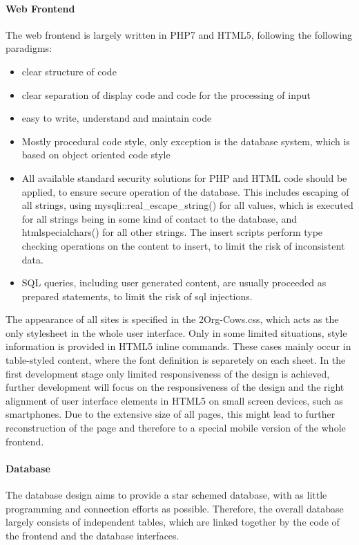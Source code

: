 \paragraph{Web Frontend}
The web frontend is largely written in PHP7 and HTML5, following the following paradigms: 
\begin{itemize}
 \item clear structure of code
 \item clear separation of display code and code for the processing of input
 \item easy to write, understand and maintain code
 \item Mostly procedural code style, only exception is the database system, which is based on object oriented code style
 \item All available standard security solutions for PHP and HTML code should be applied, to ensure secure operation of the database. This includes escaping of all strings, using 
 mysqli::real\_escape\_string() for all values, which is executed for all strings being in some kind of contact to the database, and htmlspecialchars() for all other strings. 
 The insert scripts perform type checking operations on the content to insert, to limit the risk of inconsistent data.
 \item SQL queries, including user generated content, are usually proceeded as prepared statements, to limit the risk of sql injections.
\end{itemize}
The appearance of all sites is specified in the 2Org-Cows.css, which acts as the only stylesheet in the whole user interface. Only in some limited situations, style information is 
provided in HTML5 inline commands. These cases mainly occur in table-styled content, where the font definition is separetely on each sheet.  
In the first development stage only limited responsiveness of the design is achieved, further development will focus on the responsiveness of the design
and the right alignment of user interface elements in HTML5 on small screen devices, such as smartphones. Due to the extensive size of all pages, this might lead to further 
reconstruction of the page and therefore to a special mobile version of the whole frontend.
\paragraph{Database}
The database design aims to provide a star schemed database, with as little programming and connection efforts as possible. Therefore, the overall database largely consists of 
independent tables, which are linked together by the code of the frontend and the database interfaces.